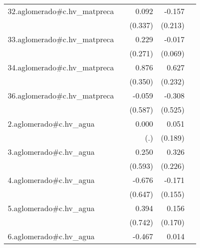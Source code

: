 {\begin{longtable}{l*{4}{D{.}{.}{-1}}}
\addlinespace
32.aglomerado#c.hv\_matpreca&                     &       0.092         &      -0.157         &                     \\
            &                     &     (0.337)         &     (0.213)         &                     \\
\addlinespace
33.aglomerado#c.hv\_matpreca&                     &       0.229         &      -0.017         &                     \\
            &                     &     (0.271)         &     (0.069)         &                     \\
\addlinespace
34.aglomerado#c.hv\_matpreca&                     &       0.876\sym{*}  &       0.627\sym{**} &                     \\
            &                     &     (0.350)         &     (0.232)         &                     \\
\addlinespace
36.aglomerado#c.hv\_matpreca&                     &      -0.059         &      -0.308         &                     \\
            &                     &     (0.587)         &     (0.525)         &                     \\
\addlinespace
2.aglomerado#c.hv\_agua&                     &       0.000         &       0.051         &                     \\
            &                     &         (.)         &     (0.189)         &                     \\
\addlinespace
3.aglomerado#c.hv\_agua&                     &       0.250         &       0.326         &                     \\
            &                     &     (0.593)         &     (0.226)         &                     \\
\addlinespace
4.aglomerado#c.hv\_agua&                     &      -0.676         &      -0.171         &                     \\
            &                     &     (0.647)         &     (0.155)         &                     \\
\addlinespace
5.aglomerado#c.hv\_agua&                     &       0.394         &       0.156         &                     \\
            &                     &     (0.742)         &     (0.170)         &                     \\
\addlinespace
6.aglomerado#c.hv\_agua&                     &      -0.467         &       0.014         &                     \\

\end{longtable}}
